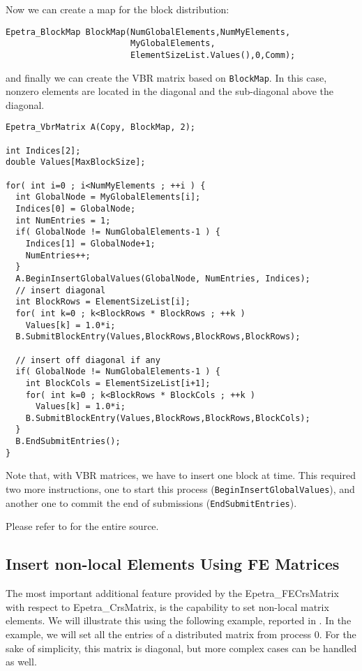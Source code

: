 Now we can create a map for the block distribution:
\begin{verbatim}
Epetra_BlockMap BlockMap(NumGlobalElements,NumMyElements,
                         MyGlobalElements, 
                         ElementSizeList.Values(),0,Comm);
\end{verbatim}
and finally we can create the VBR matrix based on \verb!BlockMap!. In
this case, nonzero elements are located in the diagonal and the
sub-diagonal above the diagonal.
\begin{verbatim}
Epetra_VbrMatrix A(Copy, BlockMap, 2);

int Indices[2];
double Values[MaxBlockSize];

for( int i=0 ; i<NumMyElements ; ++i ) {
  int GlobalNode = MyGlobalElements[i];
  Indices[0] = GlobalNode;
  int NumEntries = 1;
  if( GlobalNode != NumGlobalElements-1 ) {
    Indices[1] = GlobalNode+1;
    NumEntries++;
  }
  A.BeginInsertGlobalValues(GlobalNode, NumEntries, Indices);
  // insert diagonal
  int BlockRows = ElementSizeList[i];
  for( int k=0 ; k<BlockRows * BlockRows ; ++k )
    Values[k] = 1.0*i;
  B.SubmitBlockEntry(Values,BlockRows,BlockRows,BlockRows);

  // insert off diagonal if any
  if( GlobalNode != NumGlobalElements-1 ) {
    int BlockCols = ElementSizeList[i+1];
    for( int k=0 ; k<BlockRows * BlockCols ; ++k )
      Values[k] = 1.0*i;
    B.SubmitBlockEntry(Values,BlockRows,BlockRows,BlockCols);
  }
  B.EndSubmitEntries();
}
\end{verbatim}
Note that, with VBR matrices, we have to insert one block at time.  This
required two more instructions, one to start this process
(\verb!BeginInsertGlobalValues!), and another one to commit the end of
submissions (\verb!EndSubmitEntries!).
 
\smallskip

Please refer to  for the entire source.


\subsection{Insert non-local Elements Using FE Matrices}
\label{sec:fematrix}

The most important additional feature provided by the
Epetra\_FECrsMatrix with respect to Epetra\_CrsMatrix, is the capability
to set non-local matrix elements. We will illustrate this using the
following example, reported in \newline {}. In the
example, we will set all the entries of a distributed matrix from
process 0. For the sake of simplicity, this matrix is diagonal, but more
complex cases can be handled as well.

